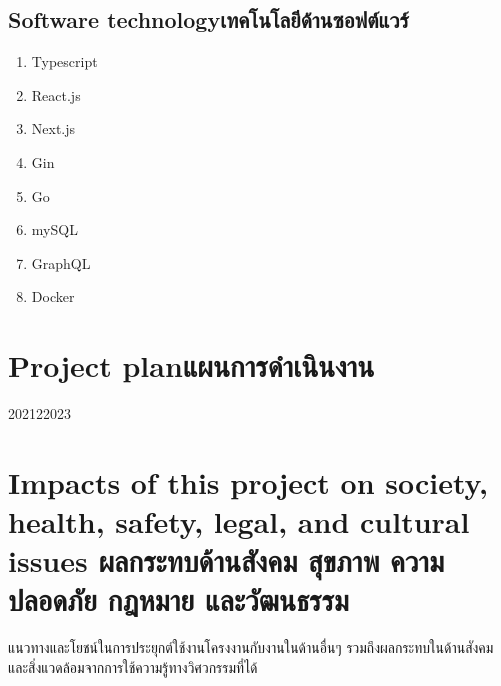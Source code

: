 \subsection{\ifenglish Software technology\else เทคโนโลยีด้านซอฟต์แวร์\fi}
\begin{enumerate}
    \item Typescript
    \item React.js
    \item Next.js
    \item Gin
    \item Go
    \item mySQL
    \item GraphQL
    \item Docker
\end{enumerate}

\section{\ifenglish Project plan\else แผนการดำเนินงาน\fi}
\begin{plan}{12}{2021}{2}{2023}
\end{plan}


\section{\ifenglish%
Impacts of this project on society, health, safety, legal, and cultural issues
\else%
ผลกระทบด้านสังคม สุขภาพ ความปลอดภัย กฎหมาย และวัฒนธรรม
\fi}

แนวทางและโยชน์ในการประยุกต์ใช้งานโครงงานกับงานในด้านอื่นๆ รวมถึงผลกระทบในด้านสังคมและสิ่งแวดล้อมจากการใช้ความรู้ทางวิศวกรรมที่ได้
